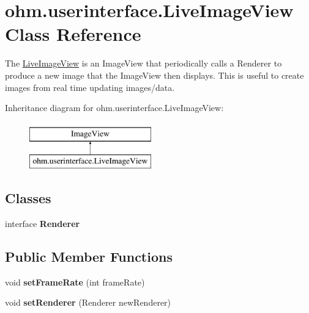 \hypertarget{classohm_1_1userinterface_1_1_live_image_view}{}\section{ohm.\+userinterface.\+Live\+Image\+View Class Reference}
\label{classohm_1_1userinterface_1_1_live_image_view}


The \hyperlink{classohm_1_1userinterface_1_1_live_image_view}{Live\+Image\+View} is an Image\+View that periodically calls a Renderer to produce a new image that the Image\+View then displays. This is useful to create images from real time updating images/data.  


Inheritance diagram for ohm.\+userinterface.\+Live\+Image\+View\+:\begin{figure}[H]
\begin{center}
\leavevmode
\includegraphics[height=2.000000cm]{classohm_1_1userinterface_1_1_live_image_view}
\end{center}
\end{figure}
\subsection*{Classes}
\begin{DoxyCompactItemize}
\item 
interface {\bfseries Renderer}
\end{DoxyCompactItemize}
\subsection*{Public Member Functions}
\begin{DoxyCompactItemize}
\item 
\hypertarget{classohm_1_1userinterface_1_1_live_image_view_adb27a4d64d1d6ad4b5141fbc021f493d}{}\label{classohm_1_1userinterface_1_1_live_image_view_adb27a4d64d1d6ad4b5141fbc021f493d} 
void {\bfseries set\+Frame\+Rate} (int frame\+Rate)
\item 
\hypertarget{classohm_1_1userinterface_1_1_live_image_view_adc84c60fead29aa42106096efcb1912c}{}\label{classohm_1_1userinterface_1_1_live_image_view_adc84c60fead29aa42106096efcb1912c} 
void {\bfseries set\+Renderer} (Renderer new\+Renderer)
\end{DoxyCompactItemize}


